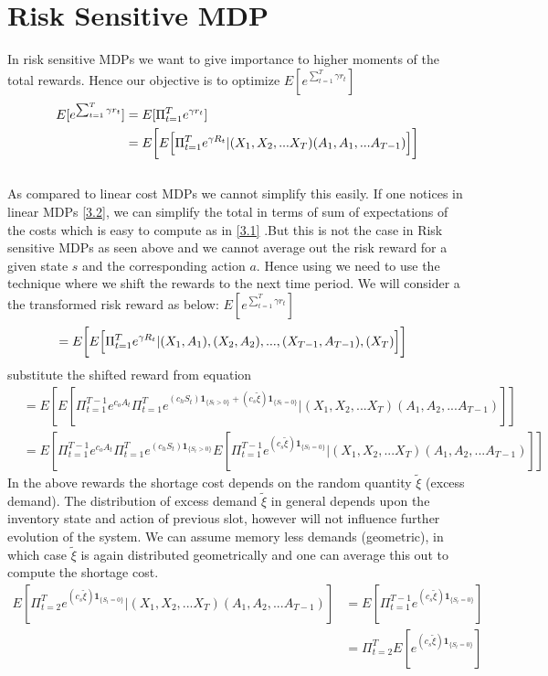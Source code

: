 \documentclass[11pt,a4paper,oneside]{report}
\begin{document}
\section{Risk Sensitive MDP}
In risk sensitive MDPs we want to give importance to higher moments of the total rewards. Hence our objective is to optimize $E[e^{\sum_{t=1}^T \gamma r_t}]$
\begin{align}
E[e^{\sum_{t=1}^T \gamma r_t}]&=E[\Pi_{t=1}^Te^{ \gamma r_t}]\\
\nonumber
&=E \bigg{[}E\Big[\Pi_{t=1}^{T}e^{\gamma R_t}|(X_1,X_2,...X_T)(A_1,A_1,...A_{T-1})\Big]\bigg] 
\end{align}
\\ As compared to linear cost MDPs we cannot simplify this easily. If one notices in linear MDPs \ref{3.2}, we can simplify the total in terms of sum of expectations of the costs which is easy to compute as in \ref{3.1} .But this is not the case in Risk sensitive MDPs as seen above and we cannot average out the risk reward for a given state $s$ and the corresponding action $a$.  Hence using we need to use the technique where we shift the rewards to the next time period. We will consider a the transformed risk reward as below:
$E[e^{\sum_{t=1}^T \gamma r_t}]$
\begin{align}
&=E \bigg{[}E\Big[\Pi_{t=1}^{T}e^{\gamma R_t}|{(X_1,A_1),(X_2,A_2),...,(X_{T-1},A_{T-1}),(X_T)}\Big]\bigg]
\end{align}
substitute the shifted reward from equation
\begin{align}
&=E[E[\Pi_{t=1}^{T-1} e^{c_o A_t}\Pi_{t=1}^{T}e^{(c_h S_t)\mathbf{1}_{\lbrace S_t>0\rbrace}+(c_s \tilde{\xi})\mathbf{1}_{\lbrace S_t=0\rbrace}}|(X_1,X_2,...X_T)(A_1,A_2,...A_{T-1})]]\\
\nonumber
&=E[\Pi_{t=1}^{T-1} e^{c_o A_t}\Pi_{t=1}^{T}e^{(c_h S_t)\mathbf{1}_{\lbrace S_t>0\rbrace}}E[\Pi_{t=1}^{T-1}e^{(c_s \tilde{\xi})\mathbf{1}_{\lbrace S_t=0\rbrace}}|(X_1,X_2,...X_T)(A_1,A_2,...A_{T-1})]]
\end{align}
In the above rewards the shortage cost depends on the random quantity $\tilde\xi$ (excess demand). The distribution of excess demand $\tilde\xi$ in general depends upon the inventory state and action of previous slot, however will not influence further evolution of the system.  We can assume memory less demands (geometric), in which case $\tilde\xi$ is again distributed geometrically and one can average this out to compute the shortage cost.
\begin{align}
E[\Pi_{t=2}^{T}e^{(c_s \tilde{\xi})\mathbf{1}_{\lbrace S_t=0\rbrace}}|(X_1,X_2,...X_T)(A_1,A_2,...A_{T-1})]&=E[\Pi_{t=1}^{T-1}e^{(c_s \tilde{\xi})\mathbf{1}_{\lbrace S_t=0\rbrace}}]\\ \nonumber
&=\Pi_{t=2}^{T}E[e^{(c_s \tilde{\xi})\mathbf{1}_{\lbrace S_t=0\rbrace}}]
\end{align}
\end{document}
